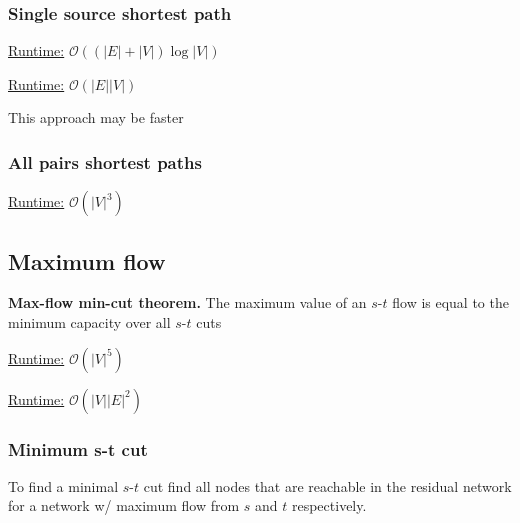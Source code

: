 \subsubsection{Single source shortest path}
\underline{Runtime:}
$\mathcal{O}((\lvert E \rvert + \lvert V \rvert )\log \lvert V
\rvert)$

\underline{Runtime:} $\mathcal{O}(\lvert E \rvert \lvert V \rvert)$

This approach may be faster
\subsubsection{All pairs shortest paths}
\underline{Runtime:} $\mathcal{O}(\lvert V \rvert^3)$

\subsection{Maximum flow}

\textbf{Max-flow min-cut theorem.} The maximum value of an $s$-$t$ flow is
equal to the minimum capacity over all $s$-$t$ cuts

\underline{Runtime:} $\mathcal{O}(\lvert V \rvert^5)$

\underline{Runtime:} $\mathcal{O}(\lvert V \rvert \lvert E \rvert^2)$

\subsubsection{Minimum s-t cut}

To find a minimal $s$-$t$ cut find all nodes that are reachable in the
residual network for a network w/ maximum flow from $s$ and $t$
respectively.


